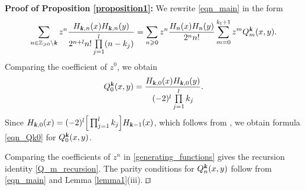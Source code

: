 \documentclass[12pt]{article}
\def\qed{\hfill$\sqcap\kern-8.0pt\hbox{$\sqcup$}$\\}
\def\z{{\mathbb Z}}
\def\k{\textbf{\textsl{k}}}
\begin{document}
\noindent
{\bf Proof of Proposition \ref{proposition1}:}
We rewrite \eqref{eqn_main} in the form
\begin{equation}\label{generating_functions}
\sum\limits_{n \in \z_{\geqslant 0} \setminus \k}  z^n \frac{H_{\k,n}(x) H_{\k,n}(y)}{2^{n+l} n! \prod\limits_{j=1}^l (n-k_j)}= \sum\limits_{n\geqslant 0} z^n \frac{H_n(x) H_n(y)}{2^n n!} \sum_{m=0}^{k_l+1} z^m Q_m^{\k}(x,y). 
\end{equation}
Comparing the coefficient of $z^0$, we obtain
\[
Q_0^{\k}(x,y)= \frac{H_{\k,0}(x) H_{\k,0}(y)}{(-2)^{l}  \prod\limits_{j=1}^l k_j}. 
\]
Since $H_{\k,0}(x)=(-2)^l \Big[\prod_{j=1}^l k_j\Big] H_{\k-1}(x)$, which follows from \cite[Lemma 3.1]{Ullate_2018}, we obtain formula \eqref{eqn_Qk0} for  $Q_0^{\k}(x,y)$. 

Comparing the coefficients of $z^n$ in \eqref{generating_functions} gives the recursion identity \eqref{Q_m_recursion}. The parity conditions for $Q_n^{\k}(x,y)$ follow from \eqref{eqn_main} and Lemma \ref{lemma1}(iii). 
\qed
\end{document}
